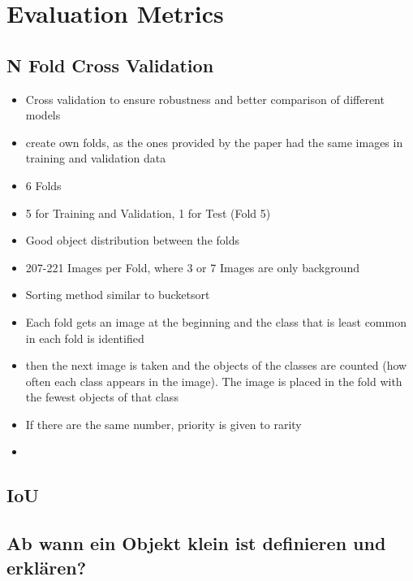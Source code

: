 \section{Evaluation Metrics}
\subsection{N Fold Cross Validation}
\begin{itemize}
    \item Cross validation to ensure robustness and better comparison of different models
    \item create own folds, as the ones provided by the paper had the same images in training and validation data
    \item  6 Folds
    \item 5 for Training and Validation, 1 for Test (Fold 5)
    \item Good object distribution between the folds
    \item 207-221 Images per Fold, where 3 or 7 Images are only background
    
    \item Sorting method similar to bucketsort
    \item Each fold gets an image at the beginning and the class that is least common in each fold is identified
    \item then the next image is taken and the objects of the classes are counted (how often each class appears in the image). The image is placed in the fold with the fewest objects of that class
    \item If there are the same number, priority is given to rarity
    \item {}


\end{itemize}

\subsection{IoU}

\subsection{Ab wann ein Objekt klein ist definieren und erklären?}


